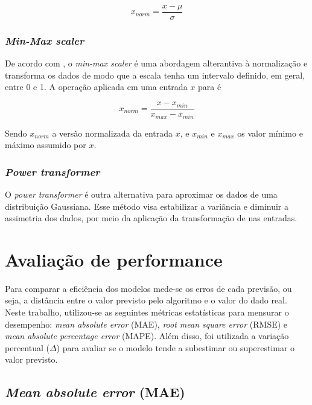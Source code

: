 \begin{equation}
  x_{norm} = \frac{x - \mu}{\sigma}
\end{equation}

\subsubsection{\textit{Min-Max scaler}}

De acordo com \citet{Raschka}, o \textit{min-max scaler} é uma 
abordagem alterantiva à normalização 
e transforma os dados de modo que a 
escala tenha um intervalo definido, em geral, entre
0 e 1. A operação aplicada em uma entrada $x$ para é

\begin{equation}
  x_{norm} = \frac{x - x_{min}}{x_{max} - x_{min}}
\end{equation}

Sendo $x_{norm}$ a versão normalizada da entrada $x$, e $x_{min}$ e $x_{max}$
os valor mínimo e máximo assumido por $x$. 

\subsubsection{\textit{Power transformer}}

O \textit{power transformer} é outra alternativa para aproximar os dados 
de uma distribuição Gaussiana. Esse método visa estabilizar a variância e 
diminuir a assimetria dos dados, por meio da aplicação da 
transformação de \citet{yeo} nas entradas. 


\section{Avaliação de performance}

Para comparar a eficiência dos modelos mede-se os erros de 
cada previsão, ou seja, a distância entre o valor previsto 
pelo algoritmo e o valor do dado real. Neste trabalho, 
utilizou-se as seguintes métricas estatísticas para 
mensurar o desempenho: \textit{mean absolute error} (MAE),
\textit{root mean square  error} (RMSE) e \textit{mean 
absolute percentage error} (MAPE). Além disso, foi utilizada
a variação percentual ($\Delta$) para avaliar se o modelo tende 
a subestimar ou superestimar o valor previsto.

\subsection{\textit{Mean absolute error} (MAE)}

